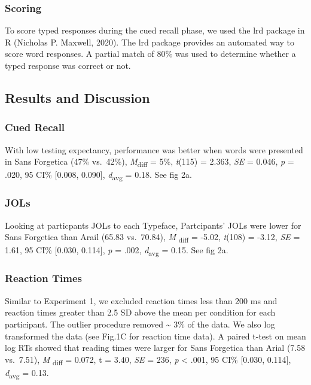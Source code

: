 \documentclass[
  english,
  man]{apa6}
\begin{document}
\hypertarget{scoring}{%
\subsubsection{Scoring}\label{scoring}}

To score typed responses during the cued recall phase, we used the lrd package in R (Nicholas P. Maxwell, 2020). The lrd package provides an automated way to score word responses. A partial match of 80\% was used to determine whether a typed response was correct or not.

\hypertarget{results-and-discussion-1}{%
\subsection{Results and Discussion}\label{results-and-discussion-1}}

\hypertarget{cued-recall}{%
\subsubsection{Cued Recall}\label{cued-recall}}

With low testing expectancy, performance was better when words were presented in Sans Forgetica (47\% vs.~42\%), \emph{M}\textsubscript{diff} = 5\%, \emph{t}(115) = 2.363, \emph{SE} = 0.046, \emph{p} = .020, 95 CI\% {[}0.008, 0.090{]}, \emph{d}\textsubscript{avg} = 0.18. See fig 2a.

\hypertarget{jols-1}{%
\subsubsection{JOLs}\label{jols-1}}

Looking at particpants JOLs to each Typeface, Partcipants' JOLs were lower for Sans Forgetica than Arail (65.83 vs.~70.84), \emph{M} \textsubscript{diff} = -5.02, \emph{t}(108) = -3.12, \emph{SE} = 1.61, 95 CI\% {[}0.030, 0.114{]}, \emph{p} = .002, \emph{d}\textsubscript{avg} = 0.15. See fig 2a.

\hypertarget{reaction-times}{%
\subsubsection{Reaction Times}\label{reaction-times}}

Similar to Experiment 1, we excluded reaction times less than 200 ms and reaction times greater than 2.5 SD above the mean per condition for each participant. The outlier procedure removed \textasciitilde{} 3\% of the data. We also log transformed the data (see Fig.1C for reaction time data). A paired t-test on mean log RTs showed that reading times were larger for Sans Forgetica than Arial (7.58 vs.~7.51), \emph{M} \textsubscript{diff} = 0.072, t = 3.40, \emph{SE} = 236, \emph{p} \textless{} .001, 95 CI\% {[}0.030, 0.114{]}, \emph{d}\textsubscript{avg} = 0.13.
\end{document}
